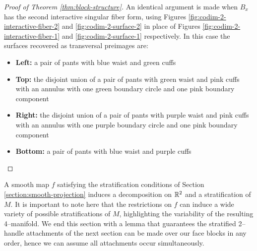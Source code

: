 \begin{proof}[Proof of Theorem \ref{thm:block-structure}]
	An identical argument is made when $B_x$ has the second interactive singular fiber form, using Figures \ref{fig:codim-2-interactive-fiber-2} and \ref{fig:codim-2-surface-2} in place of Figures \ref{fig:codim-2-interactive-fiber-1} and \ref{fig:codim-2-surface-1} respectively.
	In this case the surfaces recovered as transversal preimages are:
	{\renewcommand\labelitemi{}
	\begin{itemize}
		\item \textbf{Left:} a pair of pants with blue waist and green cuffs
		\item \textbf{Top:} the disjoint union of a pair of pants with green waist and pink cuffs with an annulus with one green boundary circle and one pink boundary component
		\item \textbf{Right:} the disjoint union of a pair of pants with purple waist and pink cuffs with an annulus with one purple boundary circle and one pink boundary component
		\item \textbf{Bottom:} a pair of pants with blue waist and purple cuffs
	\end{itemize}
	}
	



\end{proof}

A smooth map $f$ satisfying the stratification conditions of Section \ref{section:smooth-projection} induces a decomposition on $\mathbb{R}^2$ and a stratification of $M$.
It is important to note here that the restrictions on $f$ can induce a wide variety of possible stratifications of $M$, highlighting the variability of the resulting 4--manifold.
We end this section with a lemma that guarantees the stratified 2--handle attachments of the next section can be made over our face blocks in any order, hence we can assume all attachments occur simultaneously.


